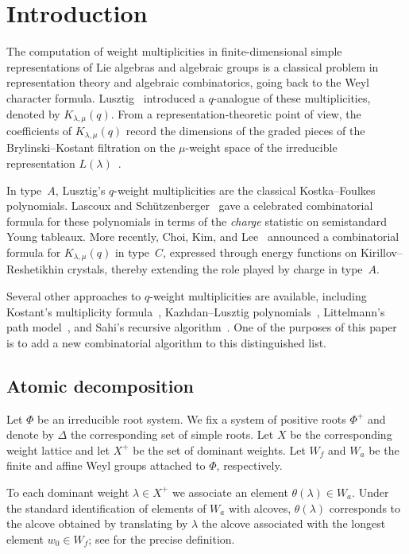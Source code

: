
\section{Introduction}

The computation of weight multiplicities in finite-dimensional simple representations of Lie algebras and algebraic groups is a classical problem in representation theory and algebraic combinatorics, going back to the Weyl character formula. Lusztig~\cite{lusztig1983singularities} introduced a $q$-analogue of these multiplicities, denoted by $K_{\lambda,\mu}(q)$. From a representation-theoretic point of view, the coefficients of $K_{\lambda,\mu}(q)$ record the dimensions of the graded pieces of the Brylinski--Kostant filtration on the $\mu$-weight space of the irreducible representation $L(\lambda)$~\cite{brylinski1989limits}.

In type~$A$, Lusztig's $q$-weight multiplicities are the classical Kostka--Foulkes polynomials. Lascoux and Sch\"utzenberger~\cite{lascoux1978conjecture} gave a celebrated combinatorial formula for these polynomials in terms of the \emph{charge} statistic on semistandard Young tableaux. More recently, Choi, Kim, and Lee~\cite{choilusztig} announced a combinatorial formula for $K_{\lambda,\mu}(q)$ in type~$C$, expressed through energy functions on Kirillov--Reshetikhin crystals, thereby extending the role played by charge in type~$A$.

Several other approaches to $q$-weight multiplicities are available, including Kostant's multiplicity formula~\cite{kostant1958formula}, Kazhdan--Lusztig polynomials~\cite{Lusztig1979}, Littelmann's path model~\cite{littelmann1995paths}, and Sahi's recursive algorithm~\cite{sahi2000new}. 
One of the purposes of this paper is to add a new combinatorial algorithm to this distinguished list.

\subsection{Atomic decomposition}

Let $\Phi$ be an irreducible root system. 
We fix a system of positive roots $\Phi^+$ and denote by $\Delta$ the corresponding set of simple roots. 
Let $X$ be the corresponding weight lattice and let $X^+$ be the set of dominant weights.
Let $W_f$ and $W_a$ be the finite and affine Weyl groups attached to $\Phi$, respectively.

To each dominant weight $\lambda\in X^+$ we associate an element $\theta(\lambda)\in W_a$. Under the standard identification of elements of $W_a$ with alcoves, $\theta(\lambda)$ corresponds to the alcove obtained by translating by $\lambda$ the alcove associated with the longest element $w_0\in W_f$; see  for the precise definition.

